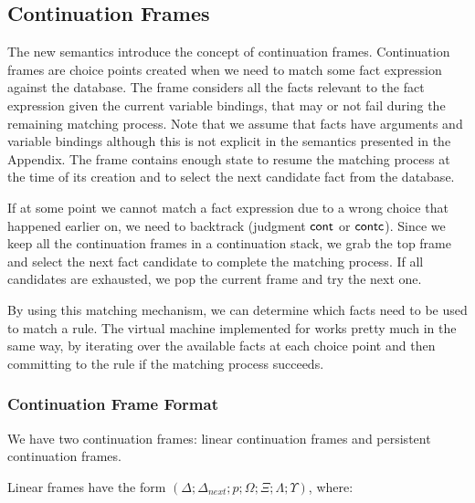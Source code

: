 \subsection{Continuation Frames}

The new semantics introduce the concept of continuation frames. Continuation frames are choice points
created when we need to match some fact expression against the database. The frame considers all the facts
relevant to the fact expression given the current variable bindings, that may or not fail during the remaining matching process. Note that we assume
that facts have arguments and variable bindings although this is not explicit in the semantics
presented in the Appendix.
The frame contains enough state to resume the matching process at the time of its creation and
to select the next candidate fact from the database.

If at some point we cannot match a fact expression due to a wrong choice that happened earlier on,
we need to backtrack (judgment $\mathsf{cont}$ or $\mathsf{contc}$). Since we keep all the continuation frames in a continuation stack,
we grab the top frame and select the next fact candidate to complete the matching process.
If all candidates are exhausted, we pop the current frame and try the next one.

By using this matching mechanism, we can determine which facts need to be used to match a rule.
The virtual machine implemented for \lang works pretty much in the same way, by iterating over
the available facts at each choice point and then committing to the rule if the matching process
succeeds.

\subsubsection{Continuation Frame Format}

We have two continuation frames: linear continuation frames and persistent continuation frames.

Linear frames have the form $(\Delta; \Delta_{next}; p; \Omega; \Xi; \Lambda; \Upsilon)$, where:

